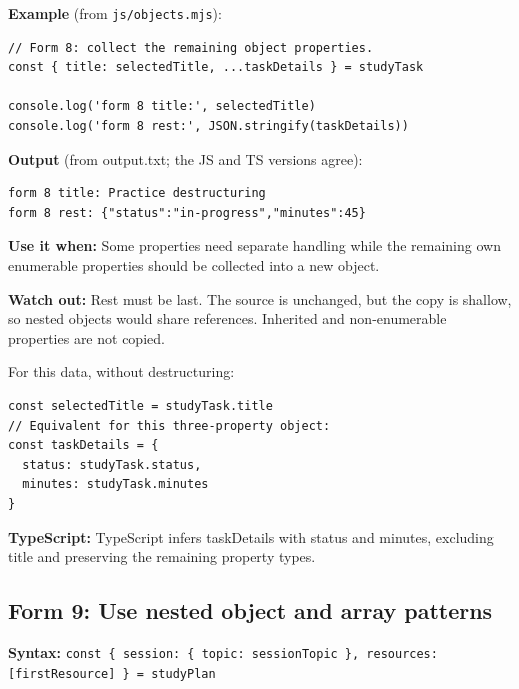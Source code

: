 \documentclass[10pt,a4paper]{article}
\begin{document}

\textbf{Example} (from \texttt{js/\allowbreak{}objects.\allowbreak{}mjs}):

\begin{lstlisting}[language=GuideJS]
// Form 8: collect the remaining object properties.
const { title: selectedTitle, ...taskDetails } = studyTask

console.log('form 8 title:', selectedTitle)
console.log('form 8 rest:', JSON.stringify(taskDetails))
\end{lstlisting}


\textbf{Output} (from output.txt; the JS and TS versions agree):

\begin{lstlisting}[language={}]
form 8 title: Practice destructuring
form 8 rest: {"status":"in-progress","minutes":45}
\end{lstlisting}

\textbf{Use it when:} Some properties need separate handling while the remaining own enumerable properties should be collected into a new object.

\textbf{Watch out:} Rest must be last. The source is unchanged, but the copy is shallow, so nested objects would share references. Inherited and non-enumerable properties are not copied.


For this data, without destructuring:

\begin{lstlisting}[language=GuideJS]
const selectedTitle = studyTask.title
// Equivalent for this three-property object:
const taskDetails = {
  status: studyTask.status,
  minutes: studyTask.minutes
}
\end{lstlisting}

\textbf{TypeScript:} TypeScript infers taskDetails with status and minutes, excluding title and preserving the remaining property types.

\subsection{Form 9: Use nested object and array patterns}

\textbf{Syntax:} \texttt{const \{ session:\allowbreak{} \{ topic:\allowbreak{} session\allowbreak{}Topic \},\allowbreak{} resources:\allowbreak{} [first\allowbreak{}Resource] \} =\allowbreak{} study\allowbreak{}Plan}
\end{document}
